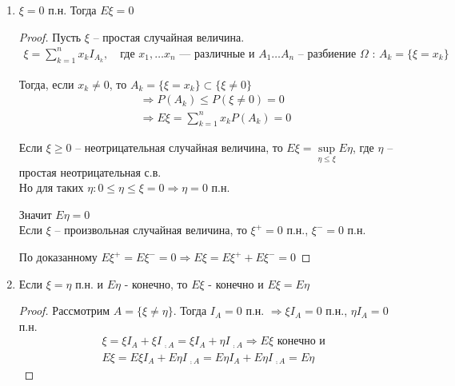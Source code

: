 \begin{enumerate}[resume*=mean_properties]

  \item
    $\xi = 0$ п.н. Тогда $E \xi = 0$

    \begin{proof}
      Пусть $\xi$ -- простая случайная величина.
      \begin{align*}
        \xi = \sum_{k = 1}^{n} x_k I_{A_k}, \quad 
        \text{где $x_1, \ldots x_n$ --- различные и $A_1 \ldots A_n$ --
        разбиение $\Omega$ : $A_k = \{ \xi = x_k \}$}
      \end{align*}

      Тогда, если $x_k \neq 0$, то $A_k = \{ \xi = x_k \} \subset \{ \xi \neq 0 \}$
      \begin{align*}
        &\Rightarrow P(A_k) \leq P(\xi \neq 0) = 0\\
        &\Rightarrow E \xi = \sum_{k = 1}^{n} x_k P(A_k) = 0
      \end{align*}

      Если $\xi \geq 0$ -- неотрицательная случайная величина, то 
      $E \xi = \sup\limits_{\eta \leq \xi} E \eta$, где $\eta$ -- простая неотрицательная с.в.\\
      Но для таких $\eta: 0 \leq \eta \leq \xi = 0 \Rightarrow \eta = 0$ п.н.

      Значит $E \eta = 0$\\

      Если $\xi$ -- произвольная случайная величина, то $\xi^+ = 0$ п.н., $\xi^- = 0$ п.н.

      По доказанному $E \xi^+ = E \xi^- = 0 \Rightarrow E \xi = E \xi^+ + E \xi^- = 0$
    \end{proof}

  \item
    Если $\xi = \eta$ п.н. и $E \eta$ - конечно, то $E \xi$ - конечно и $E \xi = E \eta$

    \begin{proof}
      Рассмотрим $A = \{\xi \neq \eta\}$. Тогда $I_A = 0$ п.н. $\Rightarrow \xi I_A = 0$ п.н.,
      $\eta I_A = 0$ п.н.
      \begin{align*}
        &\xi = \xi I_A + \xi I_{\,\comp{A}} = \xi I_A + \eta I_{\,\comp{A}} 
        \Rightarrow E \xi \text{ конечно и }\\
        &E \xi = E \xi I_A + E \eta I_{\,\comp{A}} = E \eta I_A + E \eta I_{\,\comp{A}} = E \eta
      \end{align*}
    \end{proof}


\end{enumerate}
